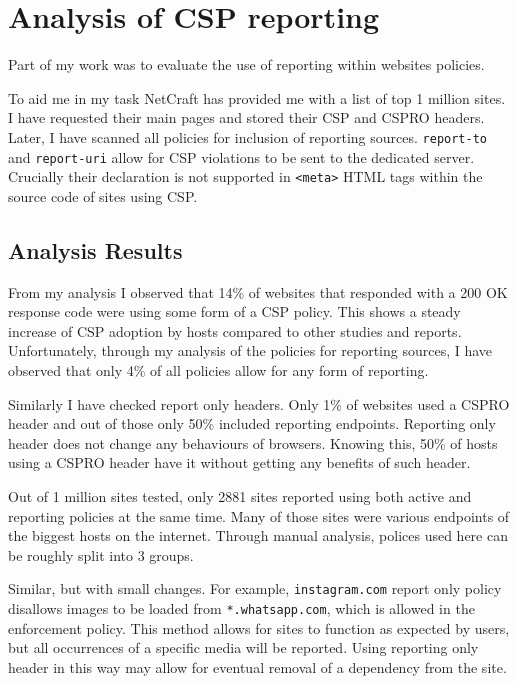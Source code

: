 \section{Analysis of CSP reporting}

Part of my work was to evaluate the use of reporting within websites policies.

To aid me in my task NetCraft has provided me with a list of top 1 million sites.
I have requested their main pages and stored their CSP and CSPRO headers.
Later, I have scanned all policies for inclusion of reporting sources.
\texttt{report-to} and \texttt{report-uri} allow for CSP violations to be sent to the dedicated server.
Crucially their declaration is not supported in \texttt{<meta>} HTML tags within the source code of sites using CSP.

\subsection{Analysis Results}

From my analysis I observed that 14\% of websites that responded with a 200 OK response code were using some form of a CSP policy.
This shows a steady increase of CSP adoption by hosts compared to other studies and reports.
Unfortunately, through my analysis of the policies for reporting sources, I have observed that only 4\% of all policies allow for any form of reporting.

Similarly I have checked report only headers. 
Only 1\% of websites used a CSPRO header and out of those only 50\% included reporting endpoints.
Reporting only header does not change any behaviours of browsers. 
Knowing this, 50\% of hosts using a CSPRO header have it without getting any benefits of such header.

Out of 1 million sites tested, only 2881 sites reported using both active and reporting policies at the same time.
Many of those sites were various endpoints of the biggest hosts on the internet.
Through manual analysis, polices used here can be roughly split into 3 groups.

Similar, but with small changes.
For example, \texttt{instagram.com} report only policy disallows images to be loaded from \texttt{*.whatsapp.com}, which is allowed in the enforcement policy.
This method allows for sites to function as expected by users, but all occurrences of a specific media will be reported.
Using reporting only header in this way may allow for eventual removal of a dependency from the site.

